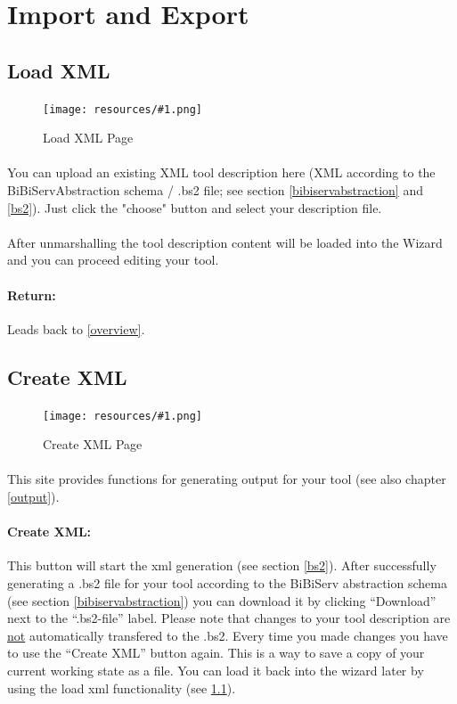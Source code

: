 \documentclass[a4paper,10pt]{book}
\newcommand{\bigpic}[1]{\texttt{[image: resources/\#1.png]}}
\begin{document}
\section{Import and Export}

\subsection{Load XML}
\label{load-xml}

\begin{figure}
 \bigpic{loadXML}
 \caption{Load XML Page}
\end{figure}

\paragraph{}You can upload an existing XML tool description here (XML according to the BiBiServAbstraction schema / .bs2 file; see section \ref{bibiservabstraction} and \ref{bs2}). Just click the "choose" button and select your description file.
\paragraph{}After unmarshalling the tool description content will be loaded into the Wizard and you can proceed editing your tool.
\paragraph{Return:} Leads back to \ref{overview}.

\subsection{Create XML}
\label{create-xml}

\begin{figure}
 \bigpic{createXML}
 \caption{Create XML Page}
\end{figure}

\paragraph{}This site provides functions for generating output for your tool (see also chapter \ref{output}).
\paragraph{Create XML:} This button will start the xml generation (see section \ref{bs2}). After successfully generating a .bs2 file for your tool according to the BiBiServ abstraction schema (see section \ref{bibiservabstraction}) you can download it by clicking ``Download'' next to the ``.bs2-file'' label. Please note that changes to your tool description are \underline{not} automatically transfered to the .bs2. Every time you made changes you have to use the ``Create XML'' button again. This is a way to save a copy of your current working state as a file. You can load it back into the wizard later by using the load xml functionality (see \ref{load-xml}).
\end{document}
